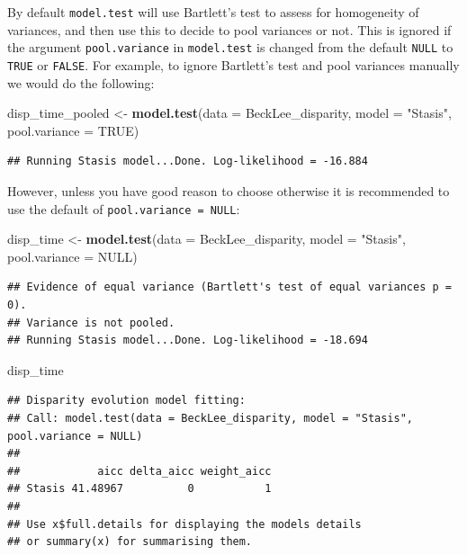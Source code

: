 \documentclass[]{book}
\newenvironment{Shaded}{\begin{snugshade}}{\end{snugshade}}
\newcommand{\DataTypeTok}[1]{\textcolor[rgb]{0.13,0.29,0.53}{#1}}
\newcommand{\KeywordTok}[1]{\textcolor[rgb]{0.13,0.29,0.53}{\textbf{#1}}}
\newcommand{\NormalTok}[1]{#1}
\newcommand{\OtherTok}[1]{\textcolor[rgb]{0.56,0.35,0.01}{#1}}
\newcommand{\StringTok}[1]{\textcolor[rgb]{0.31,0.60,0.02}{#1}}
\begin{document}
By default \texttt{model.test} will use Bartlett's test to assess for homogeneity of variances, and then use this to decide to pool variances or not.
This is ignored if the argument \texttt{pool.variance} in \texttt{model.test} is changed from the default \texttt{NULL} to \texttt{TRUE} or \texttt{FALSE}.
For example, to ignore Bartlett's test and pool variances manually we would do the following:

\begin{Shaded}
\begin{Highlighting}[]
\NormalTok{disp_time_pooled <-}\StringTok{ }\KeywordTok{model.test}\NormalTok{(}\DataTypeTok{data =}\NormalTok{ BeckLee_disparity,}
                               \DataTypeTok{model =} \StringTok{"Stasis"}\NormalTok{,}
                               \DataTypeTok{pool.variance =} \OtherTok{TRUE}\NormalTok{)}
\end{Highlighting}
\end{Shaded}

\begin{verbatim}
## Running Stasis model...Done. Log-likelihood = -16.884
\end{verbatim}

However, unless you have good reason to choose otherwise it is recommended to use the default of \texttt{pool.variance\ =\ NULL}:

\begin{Shaded}
\begin{Highlighting}[]
\NormalTok{disp_time <-}\StringTok{ }\KeywordTok{model.test}\NormalTok{(}\DataTypeTok{data =}\NormalTok{ BeckLee_disparity,}
                        \DataTypeTok{model =} \StringTok{"Stasis"}\NormalTok{,}
                        \DataTypeTok{pool.variance =} \OtherTok{NULL}\NormalTok{)}
\end{Highlighting}
\end{Shaded}

\begin{verbatim}
## Evidence of equal variance (Bartlett's test of equal variances p = 0).
## Variance is not pooled.
## Running Stasis model...Done. Log-likelihood = -18.694
\end{verbatim}

\begin{Shaded}
\begin{Highlighting}[]
\NormalTok{disp_time}
\end{Highlighting}
\end{Shaded}

\begin{verbatim}
## Disparity evolution model fitting:
## Call: model.test(data = BeckLee_disparity, model = "Stasis", pool.variance = NULL) 
## 
##            aicc delta_aicc weight_aicc
## Stasis 41.48967          0           1
## 
## Use x$full.details for displaying the models details
## or summary(x) for summarising them.
\end{verbatim}
\end{document}
